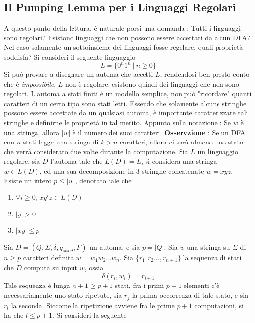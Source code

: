 \documentclass[10pt, letterpaper]{report}
\begin{document}
\subsection{Il Pumping Lemma per i Linguaggi Regolari}
A questo punto della lettura, è naturale porsi una domanda : Tutti i linguaggi sono regolari? Esistono linguaggi che 
non possono essere accettati da alcun DFA? Nel caso solamente un sottoinsieme dei linguaggi fosse regolare, quali proprietà 
soddisfa? Si consideri il seguente linguaggio 
$$ L=\{0^n1^n \ | \ n\ge 0\}$$
Si può provare a disegnare un automa che accetti $L$, rendendosi ben presto conto che è \textit{impossibile}, $L$ non è 
regolare, esistono quindi dei linguaggi che non sono regolari. L'automa a stati finiti è un modello semplice, non può 
"ricordare" quanti caratteri di un certo tipo sono stati letti. \acc 
Essendo che solamente alcune stringhe possono essere accettate da un qualsiasi automa, è importante caratterizzare tali 
stringhe e definirne le proprietà in tal merito. \acc 
Appunto sulla notazione : Se $w$ è una stringa, allora $|w|$ è il numero dei suoi caratteri.\acc
\textbf{Osservzione} : Se un DFA con $n$ stati legge una stringa di $k>n$ caratteri, allora ci sarà almeno uno stato 
che verrà considerato due volte durante la computazione. \acc 
{} Sia $L$ un linguaggio regolare, sia $D$ l'automa tale che $L(D)=L$, si considera una stringa 
$w\in L(D)$, ed una sua decomposizione in 3 stringhe concatenate $w=xyz$. Esiste un intero $p\le|w|$, denotato  
 tale che \begin{enumerate}
    \item $\forall i\ge0$, $xy^iz\in L(D)$
    \item $|y|>0$
    \item $|xy|\le p$
\end{enumerate}
\dimo{} Sia $D=(Q,\Sigma,\delta,q_{start},F)$ un automa, e sia $p=|Q|$. Sia $w$ una stringa su $\Sigma$ di $n\ge p$ caratteri definita
$w=w_1w_2\dots w_n$. Sia $\{r_1,r_2\dots,r_{n+1}\}$ la sequenza di stati che $D$ computa su input $w$, ossia 
$$ \delta(r_i,w_i)=r_{i+1}$$
Tale sequenza è lunga $n+1\ge p+1$ stati, fra i primi $p+1$ elementi c'è necessariamente uno stato ripetuto, sia 
 $r_j$ la prima occorrenza di tale stato, e sia $r_l$ la seconda.\acc 
 Siccome la ripetizione avviene fra le prime $p+1$ computazioni, si ha che $l\le p+1$. Si consideri la seguente 
\end{document}

